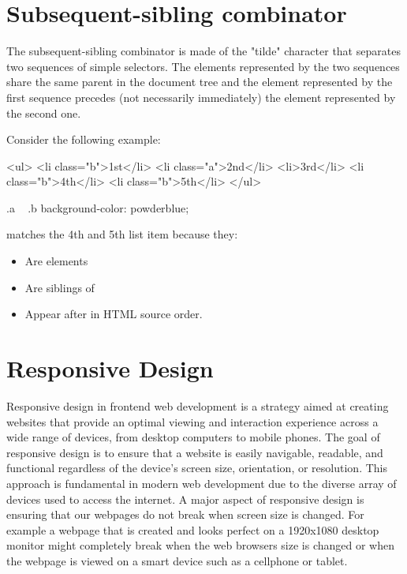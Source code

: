 \documentclass{report}
\begin{document}
    \bigbreak \noindent 
    \section{\LARGE Subsequent-sibling combinator}
    \bigbreak \noindent 
    \begin{concept}
        The subsequent-sibling combinator is made of the "tilde" character that separates two sequences of simple selectors. The elements represented by the two sequences share the same parent in the document tree and the element represented by the first sequence precedes (not necessarily immediately) the element represented by the second one.
    \end{concept}
    \bigbreak \noindent 
    Consider the following example:
    \bigbreak \noindent 
    \begin{htmlcode}
     <ul>
      <li class="b">1st</li>
      <li class="a">2nd</li>
      <li>3rd</li>
      <li class="b">4th</li>
      <li class="b">5th</li>
    </ul>   
    \end{htmlcode}
    \bigbreak \noindent 
    \begin{csscode}
        .a ~ .b {
          background-color: powderblue;
        }
    \end{csscode}
    \hspace{-.25in} matches the 4th and 5th list item because they: \hspace{.2in}
    \begin{itemize}
        \item Are  elements
        \item Are siblings of 
        \item Appear after  in HTML source order.
    \end{itemize}




    

    

    \pagebreak \bigbreak \noindent 
    \section{\LARGE Responsive Design}
    \bigbreak \noindent 
    \begin{concept}
        Responsive design in frontend web development is a strategy aimed at creating websites that provide an optimal viewing and interaction experience across a wide range of devices, from desktop computers to mobile phones. The goal of responsive design is to ensure that a website is easily navigable, readable, and functional regardless of the device's screen size, orientation, or resolution. This approach is fundamental in modern web development due to the diverse array of devices used to access the internet.
        \bigbreak \noindent 
        A major aspect of responsive design is ensuring that our webpages do not break when screen size is changed. For example a webpage that is created and looks perfect on a 1920x1080 desktop monitor might completely break when the web browsers size is changed or when the webpage is viewed on a smart device such as a cellphone or tablet.
    \end{concept}
    \bigbreak \noindent 
\end{document}
